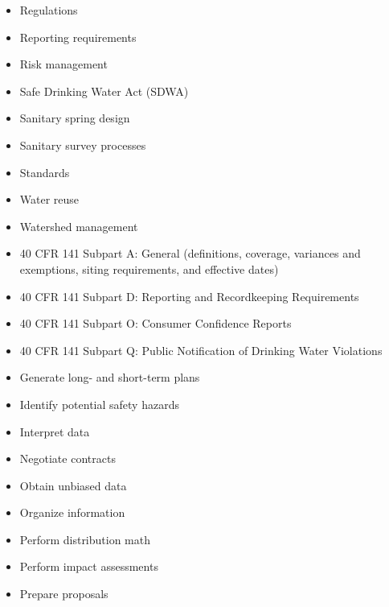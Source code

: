\documentclass[10pt]{article}
\begin{document}
\begin{itemize}
  \item Regulations

  \item Reporting requirements

  \item Risk management

  \item Safe Drinking Water Act (SDWA)

  \item Sanitary spring design

  \item Sanitary survey processes

  \item Standards

  \item Water reuse

  \item Watershed management

  \item 40 CFR 141 Subpart A: General (definitions, coverage, variances and exemptions, siting requirements, and effective dates)

  \item 40 CFR 141 Subpart D: Reporting and Recordkeeping Requirements

  \item 40 CFR 141 Subpart O: Consumer Confidence Reports

  \item 40 CFR 141 Subpart Q: Public Notification of Drinking Water Violations

  \item Generate long- and short-term plans

  \item Identify potential safety hazards

  \item Interpret data

  \item Negotiate contracts

  \item Obtain unbiased data

  \item Organize information

  \item Perform distribution math

  \item Perform impact assessments

  \item Prepare proposals


\end{itemize}
\end{document}
